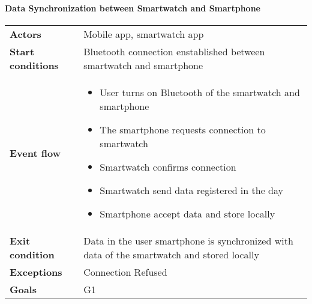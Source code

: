 \paragraph{Data Synchronization between Smartwatch and Smartphone}
\begin{center}
\begin{table}[H]
\centering
\begin{tabular}{l|l}
\textbf{Actors} & 
Mobile app, smartwatch app \\
\textbf{Start conditions} & Bluetooth connection enstablished between smartwatch and smartphone \\
\textbf{Event flow}  & \begin{minipage}[t]{0.7\textwidth}
    \begin{itemize}
        \item User turns on Bluetooth of the smartwatch and smartphone


        \item The smartphone requests connection to smartwatch

        \item Smartwatch confirms connection
        \item Smartwatch send data registered in the day 
        \item Smartphone accept data and store locally

    \end{itemize}
    
\end{minipage}\\
\textbf{Exit condition} & Data in the user smartphone is synchronized with data of the smartwatch and stored locally \\
\textbf{Exceptions} & Connection Refused \\
\textbf{Goals} & G1
\end{tabular}

\end{table}
\end{center}







